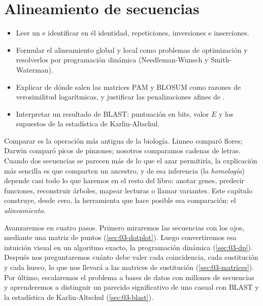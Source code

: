 \chapter{Alineamiento de secuencias}\label{cap:03}


\begin{objetivos}
\begin{itemize}
  \item Leer un  e identificar en él identidad, repeticiones, inversiones e inserciones.
  \item Formular el alineamiento global y local como problemas de optimización y resolverlos por programación dinámica (Needleman-Wunsch y Smith-Waterman).
  \item Explicar de dónde salen las matrices PAM y BLOSUM como razones de verosimilitud logarítmicas, y justificar las penalizaciones afines de .
  \item Interpretar un resultado de BLAST: puntuación en bits, valor $E$ y los supuestos de la estadística de Karlin-Altschul.
\end{itemize}
\end{objetivos}

Comparar es la operación más antigua de la biología. Linneo comparó flores; Darwin comparó picos de pinzones; nosotros comparamos cadenas de letras. Cuando dos secuencias se parecen más de lo que el azar permitiría, la explicación más sencilla es que comparten un ancestro, y de esa inferencia (la \emph{homología}) depende casi todo lo que haremos en el resto del libro: anotar genes, predecir funciones, reconstruir árboles, mapear lecturas o llamar variantes. Este capítulo construye, desde cero, la herramienta que hace posible esa comparación: el \emph{alineamiento}.

Avanzaremos en cuatro pasos. Primero miraremos las secuencias con los ojos, mediante una matriz de puntos (\cref{sec:03-dotplot}). Luego convertiremos esa intuición visual en un algoritmo exacto, la programación dinámica (\cref{sec:03-dp}). Después nos preguntaremos cuánto debe valer cada coincidencia, cada sustitución y cada hueco, lo que nos llevará a las matrices de sustitución (\cref{sec:03-matrices}). Por último, escalaremos el problema a bases de datos con millones de secuencias y aprenderemos a distinguir un parecido significativo de uno casual con BLAST y la estadística de Karlin-Altschul (\cref{sec:03-blast}).

